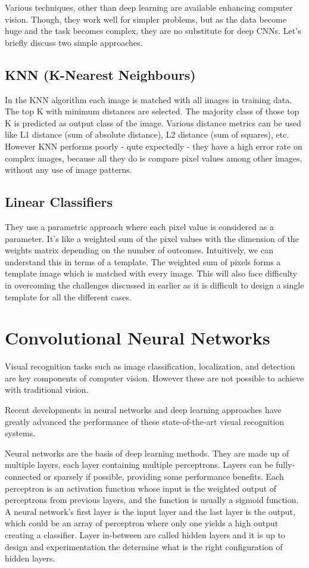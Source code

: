 Various techniques, other than deep learning are available enhancing computer
vision. Though, they work well for simpler problems, but as the data become huge
and the task becomes complex, they are no substitute for deep CNNs. Let’s
briefly discuss two simple approaches.

\subsection{KNN (K-Nearest Neighbours)}

In the KNN algorithm each image is matched with all images in training data. The
top K with minimum distances are selected. The majority class of those top K is
predicted as output class of the image. Various distance metrics can be used
like L1 distance (sum of absolute distance), L2 distance (sum of squares), etc.
However KNN performs poorly - qute expectedly - they have a high error rate on
complex images, because all they do is compare pixel values among other images,
without any use of image patterns.

\subsection{Linear Classifiers}

They use a parametric approach where each pixel value is considered as a
parameter. It’s like a weighted sum of the pixel values with the dimension of
the weights matrix depending on the number of outcomes. Intuitively, we can
understand this in terms of a template. The weighted sum of pixels forms a
template image which is matched with every image. This will also face difficulty
in overcoming the challenges discussed in earlier as it is difficult to design a
single template for all the different cases.

\section{Convolutional Neural Networks}

Visual recognition tasks such as image classification, localization, and
detection are key components of computer vision. However these are not possible
to achieve with traditional vision.

Recent developments in neural networks and deep learning approaches have greatly
advanced the performance of these state-of-the-art visual recognition systems.

Neural networks are the basis of deep learning methods. They are made up of
multiple layers, each layer containing multiple perceptrons. Layers can be
fully-connected or sparsely if possible, providing some performance benefits.
Each perceptron is an activation function whose input is the weighted output of
perceptrons from previous layers, and the function is usually a sigmoid
function. A neural network's first layer is the input layer and the last layer is
the output, which could be an array of perceptron where only one yields a high
output creating a classifier. Layer in-between are called hidden layers and it
is up to design and experimentation the determine what is the right
configuration of hidden layers.

